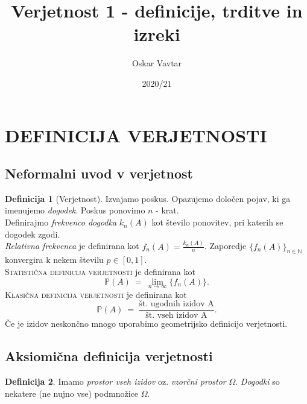 \documentclass[11pt]{article}
\title{Verjetnost 1 - definicije, trditve in izreki}
\author{Oskar Vavtar}
\date{2020/21}
\theoremstyle{definition}
\newtheorem{definicija}{Definicija}[section]
\theoremstyle{definition}
\theoremstyle{definition}
\begin{document}
\maketitle
\pagebreak
\tableofcontents
\pagebreak


\section{DEFINICIJA VERJETNOSTI}


\subsection{Neformalni uvod v verjetnost}

\begin{definicija}[Verjetnost]

Izvajamo poskus. Opazujemo določen pojav, ki ga imenujemo \textit{dogodek}. Poskus ponovimo $n$ - krat. \\
Definirajmo \textit{frekvenco dogodka} $k_n(A)$ kot število ponovitev, pri katerih se dogodek zgodi. \\
\textit{Relativna frekvenca} je definirana kot $f_n(A) = \frac{k_n(A)}{n}$.
Zaporedje $\{f_n(A)\}_{n \in \mathbb{N}}$ konvergira k nekem številu $p \in [0, 1].$ \\
\textsc{Statistična definicija verjetnosti} je definirana kot
$$\mathbb{P}(A) ~=~ \lim_{n\to\infty} \{f_n(A)\}.$$
\textsc{Klasična definicija verjetnosti} je definirana kot
$$\mathbb{P}(A) ~=~ \frac{\text{št. ugodnih izidov A}}{\text{št. vseh izidov A}}.$$
Če je izidov neskončno mnogo uporabimo geometrijsko definicijo verjetnosti.

\end{definicija}
\vspace{0.5cm}


\subsection{Aksiomična definicija verjetnosti}
\vspace{0.5cm}

\begin{definicija}

Imamo \textit{prostor vseh izidov} oz. \textit{vzorčni prostor} $\Omega$. \textit{Dogodki} so nekatere (ne nujno vse) podmnožice $\Omega$.

\end{definicija}
\vspace{0.5cm}
\end{document}
